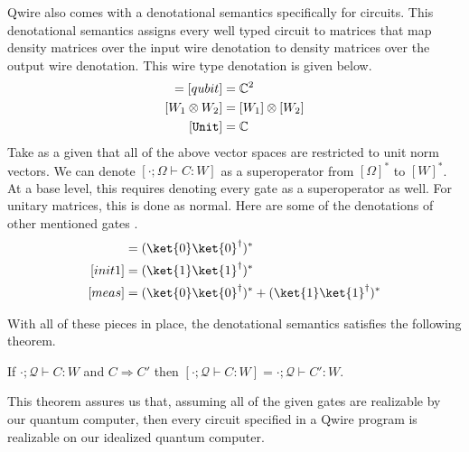 Qwire also comes with a denotational semantics specifically for circuits.
This denotational semantics assigns every well typed circuit to matrices that map density matrices over the input wire denotation to density matrices over the output wire denotation.
This wire type denotation is given below.
\begin{align*}
[bit] = [qubit] &= \mathbb{C}^2\\
[W_1 \otimes W_2] &= [W_1] \otimes [W_2]\\
[\unitt] &= \mathbb{C}
\end{align*}
Take as a given that all of the above vector spaces are restricted to unit norm vectors.
We can denote $[\cdot; \Omega \vdash C : W ]$ as a superoperator from $[\Omega]^*$ to $[W]^*$.
At a base level, this requires denoting every gate as a superoperator as well.
For unitary matrices, this is done as normal.
Here are some of the denotations of other mentioned gates .
\begin{align*}
[init0] &= (\ket{0}\ket{0}^\dagger)^*\\
[init1] &= (\ket{1}\ket{1}^\dagger)^*\\
[meas]  &= (\ket{0}\ket{0}^\dagger)^* + (\ket{1}\ket{1}^\dagger)^*
\end{align*}

With all of these pieces in place, the denotational semantics satisfies the following theorem.
\begin{theorem}
If $\cdot;\mathscr{Q}\vdash C : W$ and $C \Rightarrow C'$ then 
$[\cdot;\mathscr{Q}\vdash C : W] = \cdot;\mathscr{Q}\vdash C' : W$.
\end{theorem}

This theorem assures us that, assuming all of the given gates are realizable by our quantum computer, then every circuit specified in a Qwire program is realizable on our idealized quantum computer.